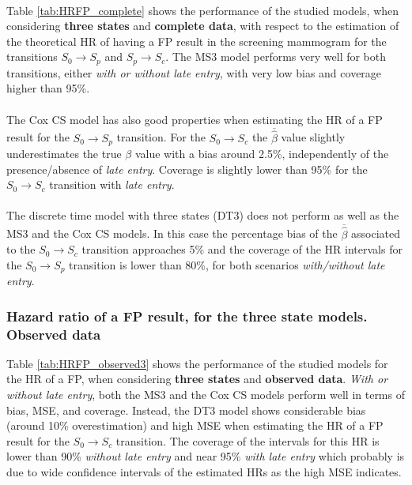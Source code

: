 \paragraph{}Table \ref{tab:HRFP_complete} shows the performance of the studied models, when
considering \textbf{three states} and \textbf{complete data}, with respect to the estimation of the
theoretical HR of having a FP result in the screening mammogram for the transitions
$S_0 \rightarrow S_p$ and $S_p \rightarrow S_c$. The MS3 model performs very well for both
transitions, either \textit{with or without late entry}, with very low bias and coverage higher
than 95\%.

\paragraph{}The Cox CS model has also good properties when estimating the HR of a FP result for the
$S_0 \rightarrow S_p$ transition. For the $S_0 \rightarrow S_c$ the $\overline{\hat\beta}$ value
slightly underestimates the true $\beta$ value with a bias around 2.5\%, independently of the
presence/absence of \textit{late entry}. Coverage is slightly lower than 95\% for the
$S_0 \rightarrow S_c$ transition with \textit{late entry}.

\paragraph{}The discrete time model with three states (DT3) does not perform as well as the MS3 and
the Cox CS models. In this case the percentage bias of the $\overline{\hat\beta}$ associated to the
$S_0 \rightarrow S_c$ transition approaches 5\% and the coverage of the HR intervals for the
$S_0 \rightarrow S_p$ transition is lower than 80\%, for both scenarios \textit{with/without late
entry}.

\subsubsection{Hazard ratio of a FP result, for the three state models. Observed data}
Table \ref{tab:HRFP_observed3} shows the performance of the studied models for the HR of a FP, when
considering \textbf{three states} and \textbf{observed data}. \textit{With or without late entry},
both the MS3 and the Cox CS models perform well in terms of bias, MSE, and coverage. Instead, the
DT3 model shows considerable bias (around 10\% overestimation) and high MSE when estimating the HR
of a FP result for the $S_0 \rightarrow S_c$ transition. The coverage of the intervals for this HR
is lower than 90\% \textit{without late entry} and near 95\% \textit{with late entry} which
probably is due to wide confidence intervals of the estimated HRs as the high MSE indicates.

